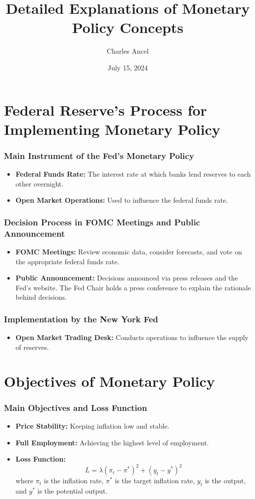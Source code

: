 \documentclass{beamer}
\title{Detailed Explanations of Monetary Policy Concepts}
\author{Charles Ancel}
\date{July 15, 2024}
\begin{document}
\frame{\titlepage}

\section{Federal Reserve's Process for Implementing Monetary Policy}

\begin{frame}
    \frametitle{Main Instrument of the Fed's Monetary Policy}
    \begin{itemize}
        \item \textbf{Federal Funds Rate:} The interest rate at which banks lend reserves to each other overnight.
        \item \textbf{Open Market Operations:} Used to influence the federal funds rate.
    \end{itemize}
\end{frame}

\begin{frame}
    \frametitle{Decision Process in FOMC Meetings and Public Announcement}
    \begin{itemize}
        \item \textbf{FOMC Meetings:} Review economic data, consider forecasts, and vote on the appropriate federal funds rate.
        \item \textbf{Public Announcement:} Decisions announced via press releases and the Fed's website. The Fed Chair holds a press conference to explain the rationale behind decisions.
    \end{itemize}
\end{frame}

\begin{frame}
    \frametitle{Implementation by the New York Fed}
    \begin{itemize}
        \item \textbf{Open Market Trading Desk:} Conducts operations to influence the supply of reserves.
    \end{itemize}
\end{frame}

\section{Objectives of Monetary Policy}

\begin{frame}
    \frametitle{Main Objectives and Loss Function}
    \begin{itemize}
        \item \textbf{Price Stability:} Keeping inflation low and stable.
        \item \textbf{Full Employment:} Achieving the highest level of employment.
        \item \textbf{Loss Function:}
        \begin{equation*}
            L = \lambda {(\pi_t - \pi^*)}^2 + {(y_t - y^*)}^2
        \end{equation*}
        where \(\pi_t\) is the inflation rate, \(\pi^*\) is the target inflation rate, \(y_t\) is the output, and \(y^*\) is the potential output.
    \end{itemize}
\end{frame}
\end{document}
